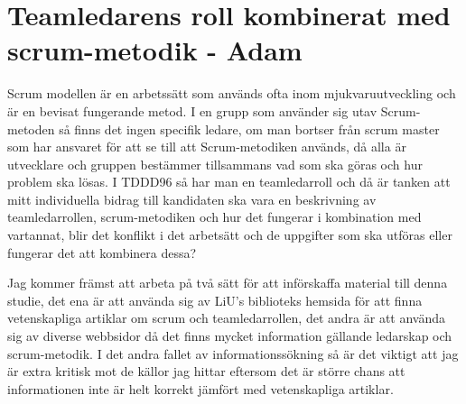 \chapter{Teamledarens roll kombinerat med scrum-metodik - Adam}

Scrum modellen är en arbetssätt som används ofta inom mjukvaruutveckling och är en bevisat fungerande metod. I en grupp som använder sig utav Scrum-metoden så finns det ingen specifik ledare, om man bortser från scrum master som har ansvaret för att se till att Scrum-metodiken används, då alla är utvecklare och gruppen bestämmer tillsammans vad som ska göras och hur problem ska lösas. I TDDD96 så har man en teamledarroll och då är tanken att mitt individuella bidrag till kandidaten ska vara en beskrivning av teamledarrollen, scrum-metodiken och hur det fungerar i kombination med vartannat, blir det konflikt i det arbetsätt och de uppgifter som ska utföras eller fungerar det att kombinera dessa?

Jag kommer främst att arbeta på två sätt för att införskaffa material till denna studie, det ena är att använda sig av LiU’s biblioteks hemsida för att finna vetenskapliga artiklar om scrum och teamledarrollen, det andra är att använda sig av diverse webbsidor då det finns mycket information gällande ledarskap och scrum-metodik. I det andra fallet av informationssökning så är det viktigt att jag är extra kritisk mot de källor jag hittar eftersom det är större chans att informationen inte är helt korrekt jämfört med vetenskapliga artiklar.
